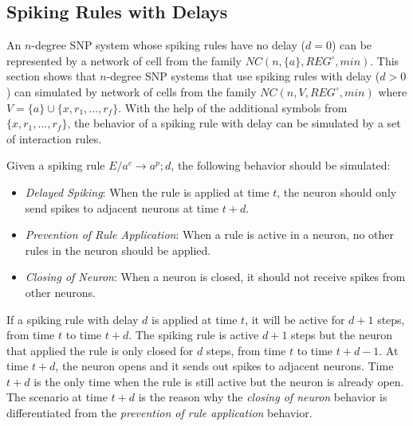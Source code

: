 \documentclass[a4paper]{article}
\theoremstyle{definition}
\newcommand{\ra}{\rightarrow}
\begin{document}

\subsection{Spiking Rules with Delays}\label{sec-delay}

An $n$-degree SNP system whose spiking rules have no delay ($d =0$) can be represented by a network 
of cell from the family $NC(n,\{a\}, REG^{\circ}, min)$. This section shows that $n$-degree SNP 
systems that use spiking rules with delay ($d > 0$) can simulated by network of cells from the 
family $NC(n, V, REG^{\circ}, min)$ where $V = \{a\} \cup \{x,r_1,...,r_f\}$. With the help of the
additional symbols from $\{x,r_1,...,r_f\}$, the behavior of a spiking rule with delay can be 
simulated by a set of interaction rules. 

Given a spiking rule $E/a^c \ra a^p;d$, the following behavior should be simulated:
\begin{itemize}
\item \emph{Delayed Spiking}: When the rule is applied at time $t$, the neuron should only send
      spikes to adjacent neurons at time $t+d$.
\item \emph{Prevention of Rule Application}: When a rule is active in a neuron, no other rules in 
      the neuron should be applied. 
\item \emph{Closing of Neuron}: When a neuron is closed, it should not receive spikes from other 
      neurons.
\end{itemize}

If a spiking rule with delay $d$ is applied at time $t$, it will be active for $d+1$ steps, from 
time $t$ to time $t+d$. The spiking rule is active $d+1$ steps but the neuron that applied the rule 
is only closed for $d$ steps, from time $t$ to time $t+d-1$. At time $t+d$, the neuron opens and it
sends out spikes to adjacent neurons. Time $t+d$ is the only time when the rule is still active 
but the neuron is already open. The scenario at time $t+d$ is the reason why the \emph{closing of
neuron} behavior is differentiated from the \emph{prevention of rule application} behavior.
\end{document}
